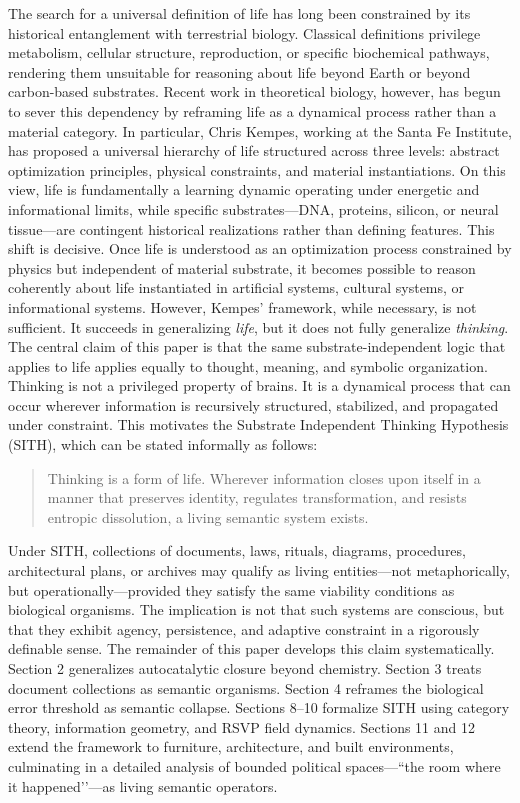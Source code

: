 \documentclass[11pt,oneside]{article}
\begin{document}
The search for a universal definition of life has long been constrained by its historical entanglement with terrestrial biology. Classical definitions privilege metabolism, cellular structure, reproduction, or specific biochemical pathways, rendering them unsuitable for reasoning about life beyond Earth or beyond carbon-based substrates. Recent work in theoretical biology, however, has begun to sever this dependency by reframing life as a dynamical process rather than a material category.
In particular, Chris Kempes, working at the Santa Fe Institute, has proposed a universal hierarchy of life structured across three levels: abstract optimization principles, physical constraints, and material instantiations. On this view, life is fundamentally a learning dynamic operating under energetic and informational limits, while specific substrates—DNA, proteins, silicon, or neural tissue—are contingent historical realizations rather than defining features.
This shift is decisive. Once life is understood as an optimization process constrained by physics but independent of material substrate, it becomes possible to reason coherently about life instantiated in artificial systems, cultural systems, or informational systems. However, Kempes’ framework, while necessary, is not sufficient. It succeeds in generalizing \emph{life}, but it does not fully generalize \emph{thinking}.
The central claim of this paper is that the same substrate-independent logic that applies to life applies equally to thought, meaning, and symbolic organization. Thinking is not a privileged property of brains. It is a dynamical process that can occur wherever information is recursively structured, stabilized, and propagated under constraint.
This motivates the Substrate Independent Thinking Hypothesis (SITH), which can be stated informally as follows:
\begin{quote} Thinking is a form of life. Wherever information closes upon itself in a manner that preserves identity, regulates transformation, and resists entropic dissolution, a living semantic system exists. \end{quote}
Under SITH, collections of documents, laws, rituals, diagrams, procedures, architectural plans, or archives may qualify as living entities—not metaphorically, but operationally—provided they satisfy the same viability conditions as biological organisms. The implication is not that such systems are conscious, but that they exhibit agency, persistence, and adaptive constraint in a rigorously definable sense.
The remainder of this paper develops this claim systematically. Section 2 generalizes autocatalytic closure beyond chemistry. Section 3 treats document collections as semantic organisms. Section 4 reframes the biological error threshold as semantic collapse. Sections 8–10 formalize SITH using category theory, information geometry, and RSVP field dynamics. Sections 11 and 12 extend the framework to furniture, architecture, and built environments, culminating in a detailed analysis of bounded political spaces—``the room where it happened’’—as living semantic operators.
\end{document}
